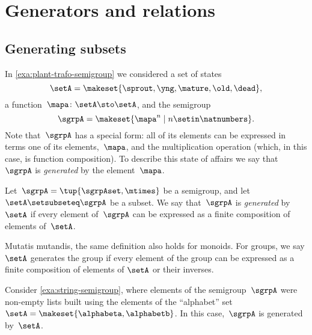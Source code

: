 
\section{Generators and relations}


\subsection{Generating subsets}

In \cref{exa:plant-trafo-semigroup} we considered a set of states
%
\begin{equation}
    \setA= \makeset{ \sprout, \yng, \mature, \old, \dead },
\end{equation}
%
a function~$\mapa \colon \setA \sto \setA$, and the semigroup
%
\begin{equation}
    \label{eq:trafo-sgrp-one-gen}
    \sgrpA = \makeset{ \mapa^n \mid n \setin \natnumbers }.
\end{equation}
%
Note that~$\sgrpA$ has a special form: all of its elements can be expressed in terms one of its elements,~$\mapa$, and the multiplication operation (which, in this case, is function composition).
To describe this state of affairs we say that~$\sgrpA$ is \emph{generated} by the element~$\mapa$.


\begin{ctdefinition}
    \label{def:gen-semigrp}
    Let~$\sgrpA = \tup{\sgrpAset, \mtimes}$ be a semigroup, and let~$\setA \setsubseteq \sgrpA$ be a subset.
    We say that~$\sgrpA$ is \emph{generated} by~$\setA$ if every element of~$\sgrpA$ can be expressed as a finite composition of elements of~$\setA$. 
\end{ctdefinition}

\begin{remark}
Mutatis mutandis, the same definition also holds for monoids. For groups, we say $\setA$ generates the group if every element of the group can be expressed as a finite composition of elements of $\setA$ or their inverses.  
\end{remark}

\begin{example}
    Consider \cref{exa:string-semigroup}, where elements of the semigroup~$\sgrpA$ were non-empty lists built using the elements of the ``alphabet'' set~$\setA = \makeset{ \alphabeta, \alphabetb}$.
    In this case,~$\sgrpA$ is generated by~$\setA$.
\end{example}

